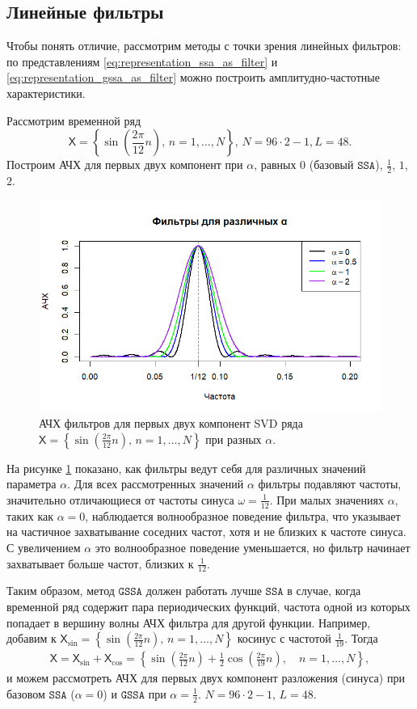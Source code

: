 \documentclass[12pt, specialist, subf
]{disser}
\theoremstyle{definition}
\newcommand{\SSA}{\texttt{SSA}}
\newcommand{\GSSA}{\texttt{GSSA}}
\newcommand{\TS}{\mathsf{X}}
\begin{document}
\subsection{Линейные фильтры}
Чтобы понять отличие, рассмотрим методы с точки зрения линейных фильтров: по представлениям \eqref{eq:representation_ssa_as_filter} и \eqref{eq:representation_gssa_as_filter} можно построить амплитудно-частотные характеристики.

Рассмотрим временной ряд \[\TS = \left\{\sin\left(\frac{2\pi}{12}n\right), \, n = 1, \dots, N\right\}, \, N = 96 \cdot 2 - 1, L = 48.\]
Построим АЧХ для первых двух компонент при $\alpha$, равных $0$ (базовый $\SSA$), $\frac{1}{2}$, $1$, $2$.
\begin{figure}[H]
	\centering
	\includegraphics[width=1\textwidth]{img/various_alphas.png}
	\caption{АЧХ фильтров для первых двух компонент SVD ряда $\TS = \left\{\sin\left(\frac{2\pi}{12}n\right), \, n = 1, \dots, N\right\}$ при разных $\alpha$.}
	\label{fig:various_alphas}
\end{figure}
На рисунке \ref{fig:various_alphas} показано, как фильтры ведут себя для различных значений параметра \(\alpha\). Для всех рассмотренных значений \(\alpha\) фильтры подавляют частоты, значительно отличающиеся от частоты синуса $ \omega = \frac{1}{12}$. При малых значениях \(\alpha\), таких как \(\alpha = 0\), наблюдается волнообразное поведение фильтра, что указывает на частичное захватывание соседних частот, хотя и не близких к частоте синуса. С увеличением \(\alpha\) это волнообразное поведение уменьшается, но фильтр начинает захватывает больше частот, близких к \(\frac{1}{12}\).

Таким образом, метод $\GSSA$ должен работать лучше $\SSA$ в случае, когда временной ряд содержит пара периодических функций, частота одной из которых попадает в вершину волны АЧХ фильтра для другой функции. Например, добавим к $\TS_{\sin} = \left\{\sin\left(\frac{2\pi}{12}n\right), \, n = 1, \dots,  N \right\}$ косинус с частотой $\frac{1}{19}$. Тогда 
\begin{align*}
\TS = \TS_{\sin} + \TS_{\cos}
= \left\{
\sin\left(\frac{2\pi}{12} n \right)
+ \frac{1}{2}\cos\left(\frac{2\pi}{19} n \right),
\quad n = 1, \dots, N
\right\},
\end{align*}
и можем рассмотреть АЧХ для первых двух компонент разложения (синуса) при базовом $\SSA$ ($\alpha = 0$) и $\GSSA$ при $\alpha = \frac{1}{2}$. $N = 96 \cdot 2 - 1$, $L = 48$.
\end{document}
